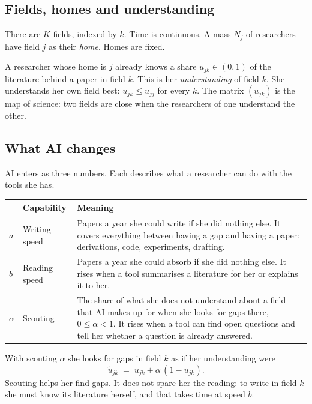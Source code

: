 \documentclass[11pt,letterpaper]{article}
\newcommand{\ut}{\tilde u}
\begin{document}
\subsection{Fields, homes and understanding}

There are $K$ fields, indexed by $k$. Time is continuous. A mass $N_j$ of researchers have field $j$ as their \emph{home}. Homes are fixed.

A researcher whose home is $j$ already knows a share $u_{jk}\in(0,1)$ of the literature behind a paper in field $k$. This is her \emph{understanding} of field $k$. She understands her own field best: $u_{jk}\le u_{jj}$ for every $k$. The matrix $(u_{jk})$ is the map of science: two fields are close when the researchers of one understand the other.

\subsection{What AI changes}

AI enters as three numbers. Each describes what a researcher can do with the tools she has.

\begin{center}\small
\begin{tabularx}{\textwidth}{@{}C{0.35in}P{1.05in}L@{}}
\toprule
 & Capability & Meaning \\
\midrule
$a$ & Writing speed & Papers a year she could write if she did nothing else. It covers everything between having a gap and having a paper: derivations, code, experiments, drafting. \\
$b$ & Reading speed & Papers a year she could absorb if she did nothing else. It rises when a tool summarises a literature for her or explains it to her. \\
$\alpha$ & Scouting & The share of what she does not understand about a field that AI makes up for when she looks for gaps there, $0\le\alpha<1$. It rises when a tool can find open questions and tell her whether a question is already answered. \\
\bottomrule
\end{tabularx}
\end{center}

With scouting $\alpha$ she looks for gaps in field $k$ as if her understanding were
\begin{equation}\label{eq:ut}
\ut_{jk} \;=\; u_{jk}+\alpha\,(1-u_{jk}).
\end{equation}
Scouting helps her find gaps. It does not spare her the reading: to write in field $k$ she must know its literature herself, and that takes time at speed $b$.
\end{document}
